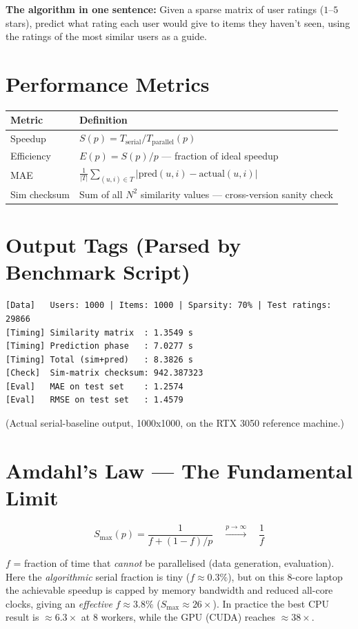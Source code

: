 \documentclass[12pt,a4paper]{report}
\begin{document}
\textbf{The algorithm in one sentence:}  Given a sparse matrix of user ratings
($1$--$5$ stars), predict what rating each user would give to items they
haven't seen, using the ratings of the most similar users as a guide.

\section*{Performance Metrics}

\begin{center}
\begin{tabular}{lp{9cm}}
\toprule
Metric & Definition \\
\midrule
Speedup & $S(p) = T_{\text{serial}} / T_{\text{parallel}}(p)$ \\
Efficiency & $E(p) = S(p) / p$ — fraction of ideal speedup \\
MAE & $\frac{1}{|T|}\sum_{(u,i)\in T}|\text{pred}(u,i) - \text{actual}(u,i)|$ \\
Sim checksum & Sum of all $N^2$ similarity values — cross-version sanity check \\
\bottomrule
\end{tabular}
\end{center}

\section*{Output Tags (Parsed by Benchmark Script)}

\begin{verbatim}
[Data]   Users: 1000 | Items: 1000 | Sparsity: 70% | Test ratings: 29866
[Timing] Similarity matrix  : 1.3549 s
[Timing] Prediction phase   : 7.0277 s
[Timing] Total (sim+pred)   : 8.3826 s
[Check]  Sim-matrix checksum: 942.387323
[Eval]   MAE on test set    : 1.2574
[Eval]   RMSE on test set   : 1.4579
\end{verbatim}
(Actual serial-baseline output, 1000x1000, on the RTX 3050 reference machine.)

\section*{Amdahl's Law — The Fundamental Limit}

\[
S_{\max}(p) = \frac{1}{f + (1-f)/p}
\quad\xrightarrow{p\to\infty}\quad \frac{1}{f}
\]

$f$ = fraction of time that \emph{cannot} be parallelised (data generation,
evaluation).  Here the \emph{algorithmic} serial fraction is tiny
($f \approx 0.3\%$), but on this 8-core laptop the achievable speedup is capped
by memory bandwidth and reduced all-core clocks, giving an \emph{effective}
$f \approx 3.8\%$ ($S_{\max} \approx 26\times$).  In practice the best CPU result
is $\approx 6.3\times$ at 8 workers, while the GPU (CUDA) reaches
$\approx 38\times$.
\end{document}
